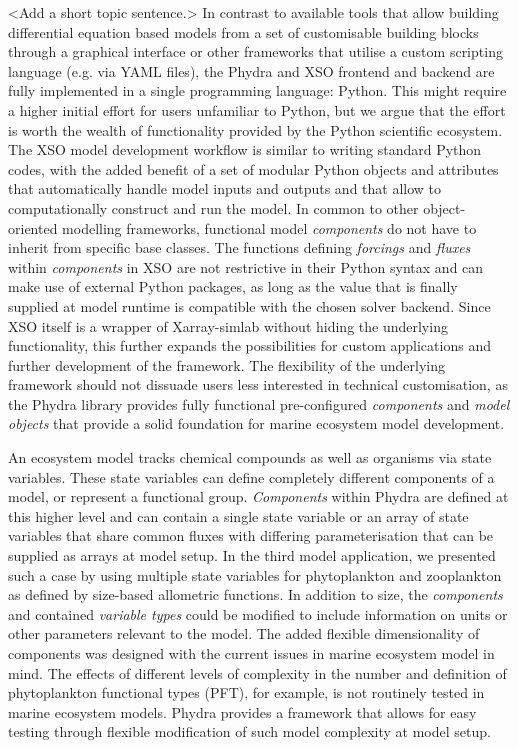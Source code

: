 \documentclass[journal abbreviation, manuscript]{copernicus}
\begin{document}
<Add a short topic sentence.> In contrast to available tools that allow building differential equation based models from a set of customisable building blocks through a graphical interface or other frameworks that utilise a custom scripting language (e.g. via YAML files), the Phydra and XSO frontend and backend are fully implemented in a single programming language: Python. This might require a higher initial effort for users unfamiliar to Python, but we argue that the effort is worth the wealth of functionality provided by the Python scientific ecosystem. The XSO model development workflow is similar to writing standard Python codes, with the added benefit of a set of modular Python objects and attributes that automatically handle model inputs and outputs and that allow to computationally construct and run the model. 
In common to other object-oriented modelling frameworks, functional model \textit{components} do not have to inherit from specific base classes. The functions defining \textit{forcings} and \textit{fluxes} within \textit{components} in XSO are not restrictive in their Python syntax and can make use of external Python packages, as long as the value that is finally supplied at model runtime is compatible with the chosen solver backend. Since XSO itself is a wrapper of Xarray-simlab without hiding the underlying functionality, this further expands the possibilities for custom applications and further development of the framework. The flexibility of the underlying framework should not dissuade users less interested in technical customisation, as the Phydra library provides fully functional pre-configured \textit{components} and \textit{model objects} that provide a solid foundation for marine ecosystem model development.

An ecosystem model tracks chemical compounds as well as organisms via state variables. These state variables can define completely different components of a model, or represent a functional group. \textit{Components} within Phydra are defined at this higher level and can contain a single state variable or an array of state variables that share common fluxes with differing parameterisation that can be supplied as arrays at model setup. In the third model application, we presented such a case by using multiple state variables for phytoplankton and zooplankton as defined by size-based allometric functions. In addition to size, the \textit{components} and contained \textit{variable types} could be modified to include information on units or other parameters relevant to the model. The added flexible dimensionality of components was designed with the current issues in marine ecosystem model in mind. The effects of different levels of complexity in the number and definition of phytoplankton functional types (PFT), for example, is not routinely tested in marine ecosystem models. Phydra provides a framework that allows for easy testing through flexible modification of such model complexity at model setup.
\end{document}
